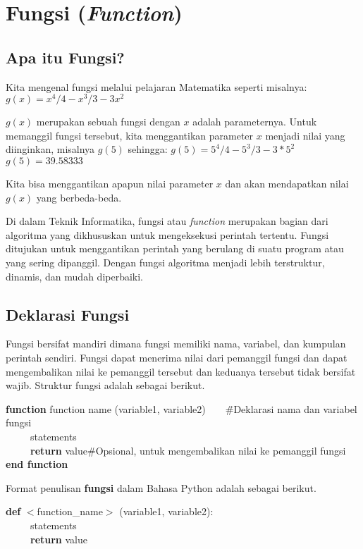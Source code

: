\chapter{Fungsi (\textit{Function})}

\section{Apa itu Fungsi?}
Kita mengenal fungsi melalui pelajaran Matematika seperti misalnya:
$g(x) = x^4/4 - x^3/3 - 3x^2$

$g(x)$ merupakan sebuah fungsi dengan $x$ adalah parameternya. Untuk memanggil fungsi tersebut, kita menggantikan parameter $x$ menjadi nilai yang diinginkan, misalnya $g(5)$ sehingga:
$g(5) = 5^4/4 - 5^3/3 - 3*5^2$
$g(5) = 39.58333$

Kita bisa menggantikan apapun nilai parameter $x$ dan akan mendapatkan nilai $g(x)$ yang berbeda-beda.

Di dalam Teknik Informatika, fungsi atau \textit{function} merupakan bagian dari algoritma yang dikhususkan untuk mengeksekusi perintah tertentu. Fungsi ditujukan untuk menggantikan perintah yang berulang di suatu program atau yang sering dipanggil. Dengan fungsi algoritma menjadi lebih terstruktur, dinamis, dan mudah diperbaiki.

\section{Deklarasi Fungsi}
Fungsi bersifat mandiri dimana fungsi memiliki nama, variabel, dan kumpulan perintah sendiri. Fungsi dapat menerima nilai dari pemanggil fungsi dan dapat mengembalikan nilai ke pemanggil tersebut dan keduanya tersebut tidak bersifat wajib. Struktur fungsi adalah sebagai berikut.

\begin{tabbing}
\textbf{function} function name (variable1, variable2)~~~~\=\#Deklarasi nama dan variabel fungsi\\
~~~~~statements\\
~~~~~\textbf{return} value\>\#Opsional, untuk mengembalikan nilai ke pemanggil fungsi\\
\textbf{end function}
\end{tabbing}

Format penulisan \textbf{fungsi} dalam Bahasa Python adalah sebagai berikut.

\begin{tabbing}
\textbf{def} $<$function\_name$>$ (variable1, variable2):\\
~~~~~statements\\
~~~~~\textbf{return} value
\end{tabbing}

